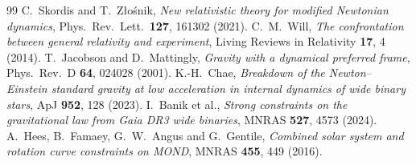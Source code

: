 \documentclass[11pt,letterpaper]{article}
\begin{document}
\begin{thebibliography}{99}
 C.\ Skordis and T.\ Z\l{}o\'snik, \emph{New relativistic theory for modified Newtonian dynamics}, Phys.\ Rev.\ Lett.\ \textbf{127}, 161302 (2021).
 C.\ M.\ Will, \emph{The confrontation between general relativity and experiment}, Living Reviews in Relativity \textbf{17}, 4 (2014).
 T.\ Jacobson and D.\ Mattingly, \emph{Gravity with a dynamical preferred frame}, Phys.\ Rev.\ D \textbf{64}, 024028 (2001).
 K.-H.\ Chae, \emph{Breakdown of the Newton--Einstein standard gravity at low acceleration in internal dynamics of wide binary stars}, ApJ \textbf{952}, 128 (2023).
 I.\ Banik et al., \emph{Strong constraints on the gravitational law from Gaia DR3 wide binaries}, MNRAS \textbf{527}, 4573 (2024).
 A.\ Hees, B.\ Famaey, G.\ W.\ Angus and G.\ Gentile, \emph{Combined solar system and rotation curve constraints on MOND}, MNRAS \textbf{455}, 449 (2016).
\end{thebibliography}
\end{document}
